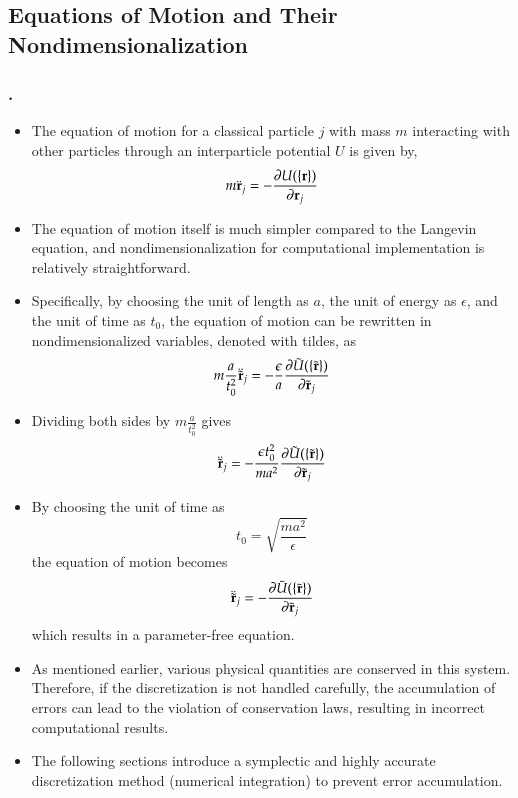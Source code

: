 \documentclass[aspectratio=169,dvipdfmx,cjk,handout,hyperref,8pt]{beamer} %
\newcommand{\tk}[1]{{\bf \color{blue} #1}}
\newcommand{\pdif}[2]{\frac{\partial #1}{\partial #2}}
\theoremstyle{example}
\newcommand{\be}{\begin{equation}}
\newcommand{\ee}{\end{equation}}
\newcommand{\bi}{\begin{itemize}}
\newcommand{\ei}{\end{itemize}}
\begin{document}
\subsection{Equations of Motion and Their Nondimensionalization}
\begin{frame}[allowframebreaks]
\frametitle{\bf \thesection.\thesubsection~\insertsubsection}
\tk{}
\bi 
\item The equation of motion for a classical particle $j$ with mass $m$ interacting with other particles through an interparticle potential $U$ is given by,
\be
m \ddot{{\bf r}}_j = -\pdif{U(\{ {\bf r} \})}{{\bf r}_j}
\ee
\item The equation of motion itself is much simpler compared to the Langevin equation, and nondimensionalization for computational implementation is relatively straightforward.
\item Specifically, by choosing the unit of length as $a$, the unit of energy as $\epsilon$, and the unit of time as $t_0$, the equation of motion can be rewritten in nondimensionalized variables, denoted with tildes, as
\be
m \frac{a}{t_0^2}\ddot{\tilde{{\bf r}}}_j = -\frac{\epsilon}{a} \pdif{\tilde{U}(\{ \tilde{\bf r} \})}{{\tilde{\bf r}}_j}
\ee
\item Dividing both sides by $m\frac {a}{t_0^2}$ gives
\be
\ddot{\tilde{{\bf r}}}_j = - \frac{\epsilon t_0^2}{m a^2} \pdif{\tilde{U}(\{ \tilde{\bf r} \})}{{\tilde{\bf r}}_j}
\ee
\item By choosing the unit of time as
\be
t_0= \sqrt{\frac{ma^2}{\epsilon}}
\ee
the equation of motion becomes
\be
\ddot{\tilde{{\bf r}}}_j = - \pdif{\tilde{U}(\{ \tilde{\bf r} \})}{{\tilde{\bf r}}_j}
\ee
which results in a parameter-free equation.
\item As mentioned earlier, various physical quantities are conserved in this system. Therefore, if the discretization is not handled carefully, the accumulation of errors can lead to the violation of conservation laws, resulting in incorrect computational results.
\item The following sections introduce a symplectic and highly accurate discretization method (numerical integration) to prevent error accumulation.
\ei
\end{frame}
\end{document}
